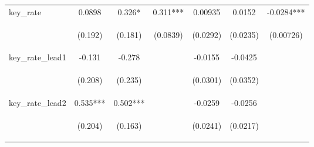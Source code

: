 \documentclass[]{article}
\begin{document}
\begin{center}
\begin{tabular}{lcccccc}
key\_rate & 0.0898 & 0.326* & 0.311*** & 0.00935 & 0.0152 & -0.0284*** \\
\vspace{4pt} & \begin{footnotesize}(0.192)\end{footnotesize} & \begin{footnotesize}(0.181)\end{footnotesize} & \begin{footnotesize}(0.0839)\end{footnotesize} & \begin{footnotesize}(0.0292)\end{footnotesize} & \begin{footnotesize}(0.0235)\end{footnotesize} & \begin{footnotesize}(0.00726)\end{footnotesize} \\
key\_rate\_lead1 & -0.131 & -0.278 &  & -0.0155 & -0.0425 &  \\
\vspace{4pt} & \begin{footnotesize}(0.208)\end{footnotesize} & \begin{footnotesize}(0.235)\end{footnotesize} & \begin{footnotesize}\end{footnotesize} & \begin{footnotesize}(0.0301)\end{footnotesize} & \begin{footnotesize}(0.0352)\end{footnotesize} & \begin{footnotesize}\end{footnotesize} \\
key\_rate\_lead2 & 0.535*** & 0.502*** &  & -0.0259 & -0.0256 &  \\
\vspace{4pt} & \begin{footnotesize}(0.204)\end{footnotesize} & \begin{footnotesize}(0.163)\end{footnotesize} & \begin{footnotesize}\end{footnotesize} & \begin{footnotesize}(0.0241)\end{footnotesize} & \begin{footnotesize}(0.0217)\end{footnotesize} & \begin{footnotesize}\end{footnotesize} \\

\end{tabular}
\end{center}
\end{document}
